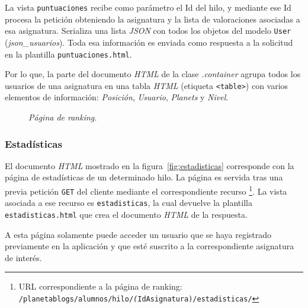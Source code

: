 \documentclass[a4paper, 12pt]{book}
\begin{document}
La vista \texttt{puntuaciones} recibe como par\'ametro el Id del hilo, y mediante ese Id procesa la petici\'on obteniendo la asignatura y la lista 
de valoraciones asociadas a esa asignatura. Serializa una lista \textit{JSON} con todos los objetos del modelo \texttt{User} (\textit{json\_usuarios}).
Toda esa informaci\'on es enviada como respuesta a la solicitud en la plantilla \texttt{puntuaciones.html}. 

Por lo que, la parte del documento \textit{HTML} de la clase \textit{.container} agrupa todos los usuarios de una asignatura en una tabla \textit{HTML} (etiqueta 
\texttt{<table>}) con varios elementos de informaci\'on: \textit{Posici\'on}, \textit{Usuario}, \textit{Planets} y \textit{Nivel}.

\begin{figure}
  \centering
  \caption{\textit{P\'agina de ranking.}}
  \label{fig:ranking}
\end{figure}


\subsubsection{Estad\'isticas} 
\label{sec:estadisticas}
El documento \textit{HTML} mostrado en la figura~\ref{fig:estadisticas} corresponde con la p\'agina de estad\'isticas de un determinado hilo. 
La p\'agina es servida tras una previa petici\'on \texttt{GET} del cliente mediante el correspondiente recurso \footnote{URL correspondiente a la p\'agina de 
ranking: \texttt{/planetablogs/alumnos/hilo/\textit(IdAsignatura)/estadisticas/}}. La vista asociada a ese recurso es \texttt{estadisticas}, la cual 
devuelve la plantilla \texttt{estadisticas.html} que crea el documento \textit{HTML} de la respuesta.

A esta p\'agina solamente puede acceder un usuario que se haya registrado previamente en la aplicaci\'on y que est\'e suscrito a la
correspondiente asignatura de inter\'es.
\end{document}
